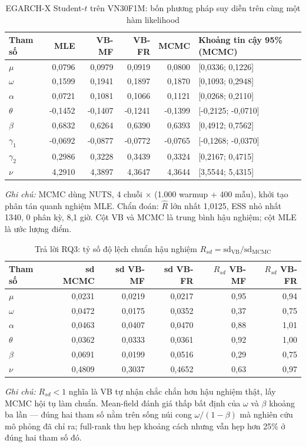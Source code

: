 \begin{table}[H]
\centering\footnotesize
\caption{EGARCH-X Student-$t$ trên VN30F1M: bốn phương pháp suy diễn trên cùng một hàm likelihood}
\label{tab:buoc3-bon-phuong-phap}
\begin{tabular}{lrrrrl}
\toprule
\textbf{Tham số} & MLE & VB-MF & VB-FR & MCMC & Khoảng tin cậy 95\% (MCMC) \\
\midrule
$\mu$ & 0,0796 & 0,0979 & 0,0919 & 0,0800 & [0,0336; 0,1226] \\
$\omega$ & 0,1599 & 0,1941 & 0,1897 & 0,1870 & [0,1093; 0,2948] \\
$\alpha$ & 0,0721 & 0,1081 & 0,1066 & 0,1121 & [0,0268; 0,2110] \\
$\theta$ & -0,1452 & -0,1407 & -0,1241 & -0,1399 & [-0,2125; -0,0710] \\
$\beta$ & 0,6832 & 0,6264 & 0,6390 & 0,6393 & [0,4912; 0,7562] \\
$\gamma_1$ & -0,0692 & -0,0877 & -0,0772 & -0,0765 & [-0,1268; -0,0370] \\
$\gamma_2$ & 0,2986 & 0,3228 & 0,3439 & 0,3324 & [0,2167; 0,4715] \\
$\nu$ & 4,2910 & 4,3897 & 4,3647 & 4,3644 & [3,5544; 5,4315] \\
\bottomrule
\end{tabular}
\vspace{0.3em}
\raggedright\scriptsize
\emph{Ghi chú:} MCMC dùng NUTS, 4 chuỗi $\times$ (1.000 warmup + 400 mẫu), khởi tạo phân tán quanh nghiệm MLE. Chẩn đoán: $\hat R$ lớn nhất 1,0125, ESS nhỏ nhất 1340, 0 phân kỳ, 8,1 giờ. Cột VB và MCMC là trung bình hậu nghiệm; cột MLE là ước lượng điểm.
\end{table}

\begin{table}[H]
\centering\footnotesize
\caption{Trả lời RQ3: tỷ số độ lệch chuẩn hậu nghiệm $R_{sd} = \mathrm{sd}_{\mathrm{VB}} / \mathrm{sd}_{\mathrm{MCMC}}$}
\label{tab:buoc3-rsd}
\begin{tabular}{lrrrrr}
\toprule
\textbf{Tham số} & sd MCMC & sd VB-MF & sd VB-FR & $R_{sd}$ VB-MF & $R_{sd}$ VB-FR \\
\midrule
$\mu$ & 0,0231 & 0,0219 & 0,0217 & 0,95 & 0,94 \\
$\omega$ & 0,0472 & 0,0175 & 0,0352 & 0,37 & 0,75 \\
$\alpha$ & 0,0463 & 0,0407 & 0,0470 & 0,88 & 1,01 \\
$\theta$ & 0,0362 & 0,0333 & 0,0361 & 0,92 & 1,00 \\
$\beta$ & 0,0691 & 0,0199 & 0,0516 & 0,29 & 0,75 \\
$\nu$ & 0,4809 & 0,3037 & 0,4652 & 0,63 & 0,97 \\
\bottomrule
\end{tabular}
\vspace{0.3em}
\raggedright\scriptsize
\emph{Ghi chú:} $R_{sd} < 1$ nghĩa là VB tự nhận chắc chắn hơn hậu nghiệm thật, lấy MCMC hội tụ làm chuẩn. Mean-field đánh giá thấp bất định của $\omega$ và $\beta$ khoảng ba lần --- đúng hai tham số nằm trên sống núi cong $\omega/(1-\beta)$ mà nghiên cứu mô phỏng đã chỉ ra; full-rank thu hẹp khoảng cách nhưng vẫn hẹp hơn 25\% ở đúng hai tham số đó.
\end{table}

